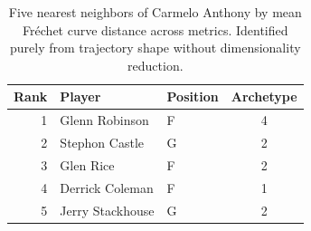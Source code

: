 \begin{table}[htbp]
  \centering\small
  \begin{tabular}{rllc}
    \toprule
    Rank & Player & Position & Archetype \\
    \midrule
    1 & Glenn Robinson & F & 4 \\
    2 & Stephon Castle & G & 2 \\
    3 & Glen Rice & F & 2 \\
    4 & Derrick Coleman & F & 1 \\
    5 & Jerry Stackhouse & G & 2 \\
    \bottomrule
  \end{tabular}
  \caption{Five nearest neighbors of Carmelo Anthony by mean Fr\'{e}chet curve distance across metrics. Identified purely from trajectory shape without dimensionality reduction.}
  \label{tab:Carmelo_Anthony_frechet_curve_neighbors}
\end{table}

